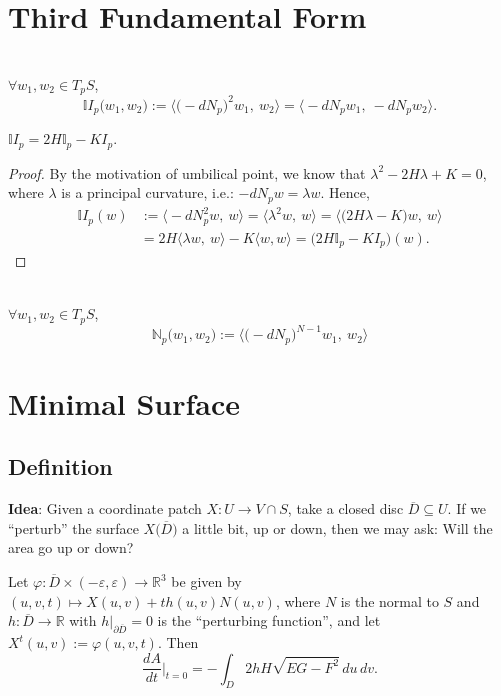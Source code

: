 \section{Third Fundamental Form}

\\
$\forall w_1, w_2\in T_pS$,
\[
\mathbb{I}I_p\big(w_1, w_2\big) := \Big\langle\big(-dN_p\big)^2 w_1,\ w_2\Big\rangle = \big\langle -dN_p w_1,\ -dN_p w_2\big\rangle.
\]

\begin{theorem}
$\mathbb{I}I_p = 2H\mathbb{I}_p - KI_p$.
\end{theorem}

\begin{proof}
By the motivation of umbilical point, we know that $\lambda^2 - 2H\lambda + K = 0$, where $\lambda$ is a principal curvature, i.e.: $-dN_p w = \lambda w$. Hence,
\begin{align*}
    \mathbb{I}I_p(w) &:= \Big\langle -dN_p^2 w,\ w\Big\rangle = \big\langle\lambda^2 w,\ w\big\rangle = \big\langle\big(2H\lambda - K\big)w,\ w\big\rangle\\
    &= 2H\big\langle\lambda w,\ w\big\rangle - K\langle w, w\rangle = \big(2H\mathbb{I}_p - KI_p\big)(w).
\end{align*}
\end{proof}

\\
$\forall w_1, w_2\in T_pS$,
\[
\mathbb{N}_p\big(w_1, w_2\big) := \Big\langle\big(-dN_p\big)^{N - 1} w_1,\ w_2\Big\rangle
\]

\section{Minimal Surface}

\subsection{Definition}

\noindent\textbf{Idea}: Given a coordinate patch $X: U\to V\cap S$, take a closed disc $\overline{D}\subseteq U$. If we ``perturb'' the surface $X\big(\overline{D}\big)$ a little bit, up or down, then we may ask: Will the area go up or down?

\begin{proposition}
Let $\varphi: \overline{D}\times(-\varepsilon, \varepsilon)\to\mathbb{R}^3$ be given by $(u, v, t)\mapsto X(u, v) + th(u, v)N(u, v)$, where $N$ is the normal to $S$ and $h: \overline{D}\to\mathbb{R}$ with $h\big|_{\partial\overline{D}} = 0$ is the ``perturbing function'', and let $X^t(u, v) := \varphi(u, v, t)$. Then
\[
\frac{dA}{dt}\Bigg|_{t = 0} = -\int_D 2hH\sqrt{EG - F^2}\,du\,dv.
\]
\end{proposition}

